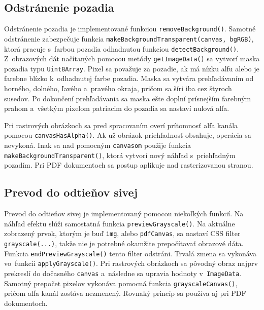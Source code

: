 \subsection{Odstránenie pozadia}

Odstránenie pozadia je implementované funkciou \texttt{removeBackground()}. Samotné odstránenie zabezpečuje funkcia \texttt{makeBackgroundTransparent(canvas, bgRGB)}, ktorá pracuje s~farbou pozadia odhadnutou funkciou \texttt{detectBackground()}. Z~obrazových dát načítaných pomocou metódy \texttt{getImageData()} sa vytvorí maska pozadia typu \texttt{Uint8Array}. Pixel sa považuje za pozadie, ak má nízku alfu alebo je farebne blízko k~odhadnutej farbe pozadia. Maska sa vytvára prehľadávaním od horného, dolného, ľavého a~pravého okraja, pričom sa šíri iba cez štyroch susedov. Po dokončení prehľadávania sa maska ešte doplní prísnejším farebným prahom a~všetkým pixelom patriacim do pozadia sa nastaví nulová alfa. 

Pri rastrových obrázkoch sa pred spracovaním overí prítomnosť alfa kanála pomocou \texttt{canvasHasAlpha()}. Ak už obrázok priehľadnosť obsahuje, operácia sa nevykoná. Inak sa nad pomocným \texttt{canvasom} použije funkcia \texttt{makeBackgroundTransparent()}, ktorá vytvorí nový náhľad s~priehľadným pozadím. Pri PDF dokumentoch sa postup aplikuje nad rasterizovanou stranou.

\subsection{Prevod do odtieňov sivej}
Prevod do odtieňov sivej je implementovaný pomocou niekoľkých funkcií. Na náhľad efektu slúži samostatná funkcia \texttt{previewGrayscale()}. Na aktuálne zobrazený prvok, ktorým je buď \texttt{img}, alebo \texttt{pdfCanvas}, sa nastaví CSS filter \texttt{grayscale(...)}, takže nie je potrebné okamžite prepočítavať obrazové dáta. Funkcia \texttt{endPreviewGrayscale()} tento filter odstráni. Trvalá zmena sa vykonáva vo~funkcii \texttt{applyGrayscale()}. Pri rastrových obrázkoch sa pôvodný obraz najprv prekreslí do dočasného \texttt{canvas} a~následne sa upravia hodnoty v~\texttt{ImageData}. Samotný prepočet pixelov vykonáva pomocná funkcia \texttt{grayscaleCanvas()}, pričom alfa kanál zostáva nezmenený. Rovnaký princíp sa používa aj pri PDF dokumentoch.

